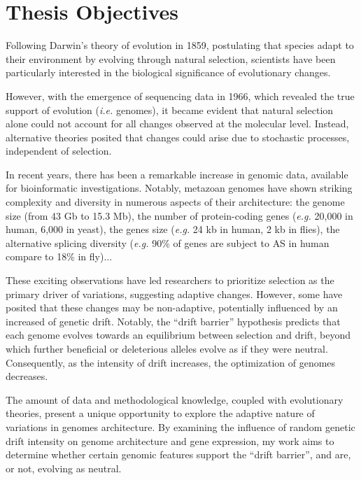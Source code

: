 \thispagestyle{empty}
\chapter{Thesis Objectives}
{\hypersetup{linkcolor=GREYDARK}\minitoc}
\label{chap:intro-objectives}

Following Darwin's theory of evolution in 1859, postulating that species adapt to their environment by evolving through natural selection, scientists have been particularly interested in the biological significance of evolutionary changes.

However, with the emergence of sequencing data in 1966, which revealed the true support of evolution (\textit{i.e.} genomes), it became evident that natural selection alone could not account for all changes observed at the molecular level. Instead, alternative theories posited that changes could arise due to stochastic processes, independent of selection.

In recent years, there has been a remarkable increase in genomic data, available for bioinformatic investigations. Notably, metazoan genomes have shown striking complexity and diversity in numerous aspects of their architecture: the genome size (from 43 \acrshort{Gb} to 15.3 \acrshort{Mb}), the number of protein-coding genes (\textit{e.g.} 20,000 in human, 6,000 in yeast), the genes size (\textit{e.g.} 24 \acrshort{kb} in human, 2 \acrshort{kb} in flies), the alternative splicing diversity (\textit{e.g.} 90\% of genes are subject to \acrshort{AS} in human compare to 18\% in fly)...

These exciting observations have led researchers to prioritize selection as the primary driver of variations, suggesting adaptive changes. However, some have posited that these changes may be non-adaptive, potentially influenced by an increased of genetic drift. Notably, the “drift barrier” hypothesis predicts that each genome evolves towards an equilibrium between selection and drift, beyond which further beneficial or deleterious alleles evolve as if they were neutral. Consequently, as the intensity of drift increases, the optimization of genomes decreases.

The amount of data and methodological knowledge, coupled with evolutionary theories, present a unique opportunity to explore the adaptive nature of variations in genomes architecture. By examining the influence of random genetic drift intensity on genome architecture and gene expression, my work aims to determine whether certain genomic features support the “drift barrier”, and are, or not, evolving as neutral.

